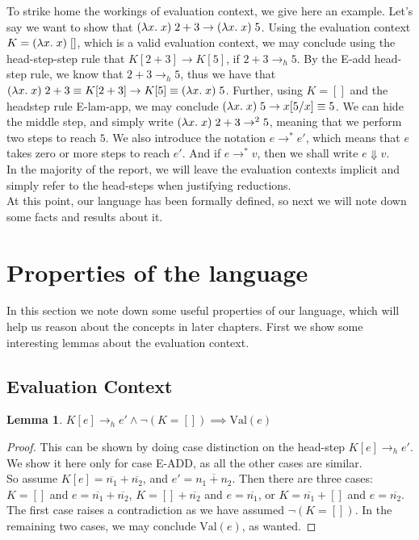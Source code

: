 \documentclass[twoside,11pt,openright]{report}
\newtheorem{lemma}[theorem]{Lemma}
\theoremstyle{definition}
\newcommand{\var}{x}
\newcommand{\expr}{e}
\newcommand{\val}{v}
\newcommand{\Num}[1]{\overline{#1}}
\newcommand{\empelctx}{[]}
\newcommand{\elctx}{K}
\newcommand{\subst}[3]{#1{\left[#3 \middle/ #2 \right]}}
\newcommand{\step}{\rightarrow}
\newcommand{\stepS}{\rightarrow^*}
\newcommand{\hstep}{\rightarrow_h}
\newcommand{\Val}[1]{\mathrm{Val}(#1)}
\begin{document}
To strike home the workings of evaluation context, we give here an example. Let's say we want to show that $(\fun \var . \var) \; 2 + 3 \step (\fun \var . \var) \; 5$. Using the evaluation context $\elctx = (\fun \var . \var) \; \empelctx$, which is a valid evaluation context, we may conclude using the head-step-step rule that $\elctx[2 + 3] \step \elctx[5]$, if $2 + 3 \hstep 5$. By the E-add head-step rule, we know that $2 + 3 \hstep 5$, thus we have that $(\fun \var . \var) \; 2 + 3 \equiv \elctx[2 + 3] \step \elctx[5] \equiv (\fun \var . \var) \; 5$. Further, using $\elctx = \empelctx$ and the headstep rule E-lam-app, we may conclude $(\fun \var . \var) \; 5 \step \subst{\var}{\var}{5} \equiv 5$. We can hide the middle step, and simply write $(\fun \var . \var) \; 2 + 3 \step^2 5$, meaning that we perform two steps to reach $5$. We also introduce the notation $\expr \stepS \expr'$, which means that $\expr$ takes zero or more steps to reach $\expr'$. And if $\expr \stepS \val$, then we shall write $\expr \Downarrow \val$.\\
In the majority of the report, we will leave the evaluation contexts implicit and simply refer to the head-steps when justifying reductions.\medskip\\
At this point, our language has been formally defined, so next we will note down some facts and results about it.

\section{Properties of the language}
In this section we note down some useful properties of our language, which will help us reason about the concepts in later chapters. First we show some interesting lemmas about the evaluation context.

\subsection{Evaluation Context}
\begin{lemma}\label{lem:headstep_val}
  $\elctx[\expr] \hstep \expr' \land \neg (\elctx = \empelctx) \implies \Val{e}$
\end{lemma}
\begin{proof}
  This can be shown by doing case distinction on the head-step $\elctx[\expr] \hstep \expr'$. We show it here only for case E-ADD, as all the other cases are similar. \medskip\\
  So assume $\elctx[\expr] = \Num{n_1} + \Num{n_2}$, and $\expr' = \Num{n_1 + n_2}$.
  Then there are three cases: $\elctx = []$ and $\expr = \Num{n_1} + \Num{n_2}$, $\elctx = [] + \Num{n_2}$ and $\expr = \Num{n_1}$, or $\elctx = \Num{n_1} + []$ and $\expr = \Num{n_2}$. The first case raises a contradiction as we have assumed $\neg (\elctx = \empelctx)$. In the remaining two cases, we may conclude $\Val{\expr}$, as wanted.
\end{proof}
\end{document}
